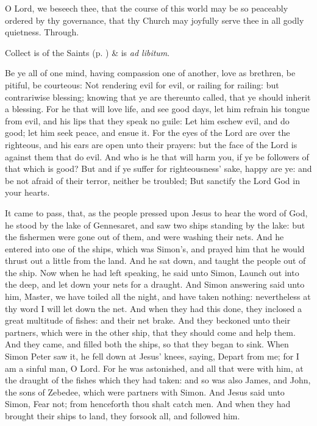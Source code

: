 \collect
{} O Lord, we beseech thee, that the course of this world may be so peaceably ordered by thy governance, that thy Church may joyfully serve thee in all godly quietness. Through.
\begin{rubric}
     Collect is of the Saints (p. \pageref{SPSaints}) \&  is \emph{ad libitum}.
\end{rubric}
 Be ye all of one mind, having compassion one of another, love as brethren, be pitiful, be courteous: Not rendering evil for evil, or railing for railing: but contrariwise blessing; knowing that ye are thereunto called, that ye should inherit a blessing. For he that will love life, and see good days, let him refrain his tongue from evil, and his lips that they speak no guile: Let him eschew evil, and do good; let him seek peace, and ensue it. For the eyes of the Lord are over the righteous, and his ears are open unto their prayers: but the face of the Lord is against them that do evil. And who is he that will harm you, if ye be followers of that which is good? But and if ye suffer for righteousness' sake, happy are ye: and be not afraid of their terror, neither be troubled; But sanctify the Lord God in your hearts.


 It came to pass, that, as the people pressed upon Jesus to hear the word of God, he stood by the lake of Gennesaret, and saw two ships standing by the lake: but the fishermen were gone out of them, and were washing their nets. And he entered into one of the ships, which was Simon's, and prayed him that he would thrust out a little from the land. And he sat down, and taught the people out of the ship. Now when he had left speaking, he said unto Simon, Launch out into the deep, and let down your nets for a draught. And Simon answering said unto him, Master, we have toiled all the night, and have taken nothing: nevertheless at thy word I will let down the net. And when they had this done, they inclosed a great multitude of fishes: and their net brake. And they beckoned unto their partners, which were in the other ship, that they should come and help them. And they came, and filled both the ships, so that they began to sink. When Simon Peter saw it, he fell down at Jesus' knees, saying, Depart from me; for I am a sinful man, O Lord. For he was astonished, and all that were with him, at the draught of the fishes which they had taken: and so was also James, and John, the sons of Zebedee, which were partners with Simon. And Jesus said unto Simon, Fear not; from henceforth thou shalt catch men. And when they had brought their ships to land, they forsook all, and followed him.

